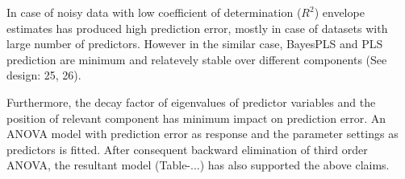 \documentclass[a4paper, 11pt]{article}
\begin{document}
In case of noisy data with low coefficient of determination ($R^2$) envelope estimates has produced high prediction error, mostly in case of datasets with large number of predictors. However in the similar case, BayesPLS and PLS prediction are minimum and relatevely stable over different components (See design: 25, 26). 

Furthermore, the decay factor of eigenvalues of predictor variables and the position of relevant component has minimum impact on prediction error. An ANOVA model with prediction error as response and the parameter settings as predictors is fitted. After consequent backward elimination of third order ANOVA, the resultant model (Table-...) has also supported the above claims.






\end{document}

